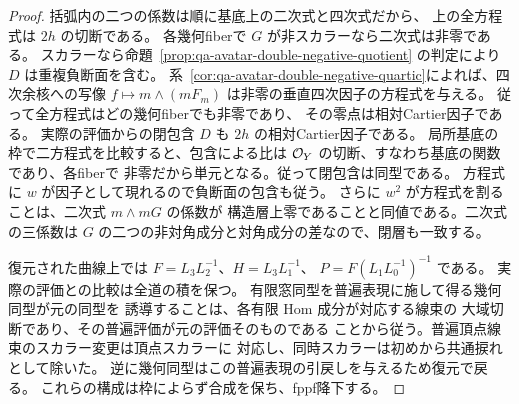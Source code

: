 \begin{proof}
括弧内の二つの係数は順に基底上の二次式と四次式だから、
上の全方程式は $2h$ の切断である。
各幾何fiberで $G$ が非スカラーなら二次式は非零である。
スカラーなら命題~\ref{prop:qa-avatar-double-negative-quotient}
の判定により $D$ は重複負断面を含む。
系~\ref{cor:qa-avatar-double-negative-quartic}によれば、四次余核への写像
$f\mapsto m\wedge(mF_m)$ は非零の垂直四次因子の方程式を与える。
従って全方程式はどの幾何fiberでも非零であり、
その零点は相対Cartier因子である。
実際の評価からの閉包含 $D$ も $2h$ の相対Cartier因子である。
局所基底の枠で二方程式を比較すると、包含による比は
$\mathcal O_Y$ の切断、すなわち基底の関数であり、各fiberで
非零だから単元となる。従って閉包含は同型である。
方程式に $w$ が因子として現れるので負断面の包含も従う。
さらに $w^2$ が方程式を割ることは、二次式 $m\wedge mG$ の係数が
構造層上零であることと同値である。二次式の三係数は
$G$ の二つの非対角成分と対角成分の差なので、閉層も一致する。

復元された曲線上では
$F=L_3L_2^{-1}$、$H=L_3L_1^{-1}$、
$P=F(L_1L_0^{-1})^{-1}$ である。
実際の評価との比較は全道の積を保つ。
有限窓同型を普遍表現に施して得る幾何同型が元の同型を
誘導することは、各有限 Hom 成分が対応する線束の
大域切断であり、その普遍評価が元の評価そのものである
ことから従う。普遍頂点線束のスカラー変更は頂点スカラーに
対応し、同時スカラーは初めから共通捩れとして除いた。
逆に幾何同型はこの普遍表現の引戻しを与えるため復元で戻る。
これらの構成は枠によらず合成を保ち、fppf降下する。
\end{proof}

